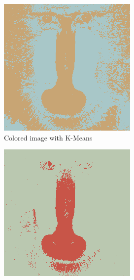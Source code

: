 \documentclass[sigconf,authorversion]{acmart}
\begin{document}
\begin{figure}[hbtp]
  \begin{subfigure}[b]{0.25\textwidth}
      \includegraphics[width=\textwidth]{../outputs/baboon_2_hsv_colored_kmeans.png}
      \caption{Colored image with K-Means}
      \label{subfig:baboon_hsv_kmeans}
  \end{subfigure}
  \hspace{0.05\textwidth}
  \begin{subfigure}[b]{0.25\textwidth}
      \includegraphics[width=\textwidth]{../outputs/baboon_2_hsv_colored_gmm.png}

\end{subfigure}
\end{figure}
\end{document}
